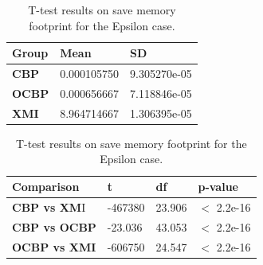 \documentclass{llncs}
\begin{document}
    \begin{table}[ht]
        \centering
        \label{table:ttest_save_memory_epsilon}
        \caption{T-test results on save memory footprint for the Epsilon case.}
        \begin{minipage}{0.44\textwidth}
            \centering
            \begin{tabular}{|p{}|p{}|p{}|}
                \hline 
                \textbf{Group}  & \textbf{Mean} & \textbf{SD} \\ 
                \hline 
                \textbf{CBP} & 0.000105750      &9.305270e-05 \\ 
                \hline 
                \textbf{OCBP} & 0.000656667   & 7.118846e-05 \\ 
                \hline 
                \textbf{XMI} &8.964714667   & 1.306395e-05 \\ 
                \hline 
            \end{tabular} 
        \end{minipage}
        \hfill
        \begin{minipage}{0.54\textwidth}
            \centering
            \begin{tabular}{|p{}|p{}|p{}|p{}|}
                \hline 
                \textbf{Comparison} & \textbf{t}  & \textbf{df} & \textbf{p-value} \\ 
                \hline 
                \textbf{CBP vs XM}I &-467380 &23.906& $<$ 2.2e-16 \\ 
                \hline 
                \textbf{CBP vs OCBP} &-23.036  &43.053 & $<$ 2.2e-16 \\ 
                \hline 
                \textbf{OCBP vs XMI} & -606750 &24.547  & $<$ 2.2e-16 \\ 
                \hline 
            \end{tabular} 
        \end{minipage}
    \end{table}
    
\end{document}
